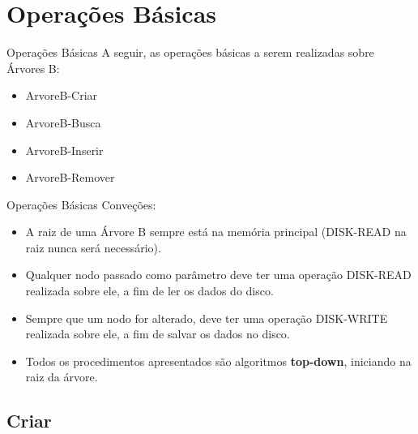 \documentclass[aspectratio=169]{beamer}
\begin{document}
{\section{Operações Básicas}

\begin{frame}{Operações Básicas}
A seguir, as operações básicas a serem realizadas sobre Árvores B:
 \begin{itemize}
 \item ArvoreB-Criar
 \item ArvoreB-Busca
 \item ArvoreB-Inserir
 \item ArvoreB-Remover
\end{itemize}
\end{frame}


\begin{frame}{Operações Básicas}
 Conveções:
\begin{itemize}
\item A raiz de uma Árvore B sempre está na memória principal (DISK-READ na raiz nunca será necessário).
\item Qualquer nodo passado como parâmetro deve ter uma operação DISK-READ realizada sobre ele, a fim de ler os dados do disco.
\item Sempre que um nodo for alterado, deve ter uma operação DISK-WRITE realizada sobre ele, a fim de salvar os dados no disco.
\item Todos os procedimentos apresentados são algoritmos {\bf top-down}, iniciando na raiz da árvore.
\end{itemize}
\end{frame}

\subsection{Criar}

}
\end{document}
